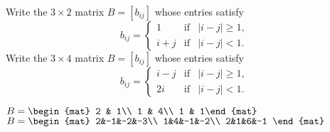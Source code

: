 \begin{Exercise}[
name={},
title={}, 
difficulty=0,
origin={\cite{MB, YL}}]
\Question Write the $3 \times 2$ matrix $B=[b_{ij}]$ whose entries satisfy
\[ b_{ij} = \left\lbrace
                                                                \begin{array}{lll}
                                                                                        1   & \mathrm{if} & |i-j|\geq1,\\
                                                                                        i+j & \mathrm{if} & |i-j|< 1. 
                                                                \end{array}\right. 
\]
\Question Write the $3 \times 4$ matrix $B=[b_{ij}]$ whose entries satisfy 
\[ b_{ij} = \left\lbrace
								\begin{array}{lll}
											i-j & \mathrm{if} & |i-j|\geq1,\\
											2i    & \mathrm{if} & |i-j|< 1. 
								\end{array}\right. 
\]
\end{Exercise}

\begin{Answer}
\begin{multicols}{2}
\Question $B=\begin{mat} 2 & 1\\ 1 & 4\\ 1 & 1\end{mat}$
\Question $B=\begin{mat} 2&-1&-2&-3\\  1&4&-1&-2\\  2&1&6&-1 \end{mat}$
\EndCurrentQuestion
\end{multicols}
\end{Answer}
